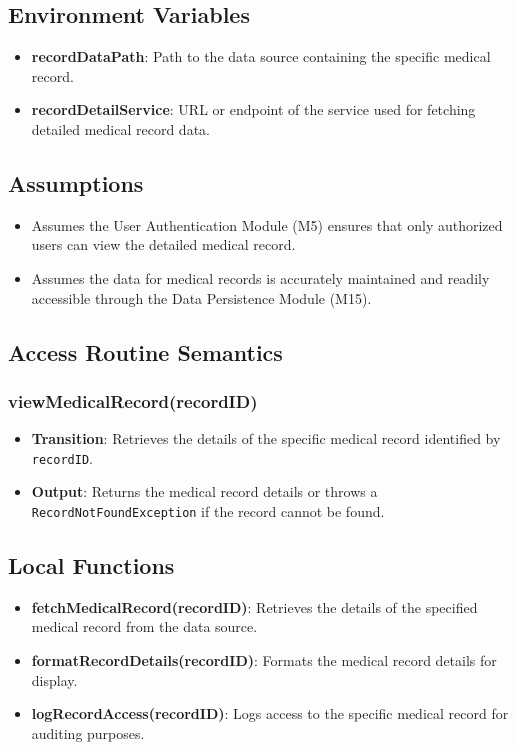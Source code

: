\documentclass[12pt, titlepage]{article}
\begin{document}
\subsection{Environment Variables}
\begin{itemize}
\item \textbf{recordDataPath}: Path to the data source containing the specific medical record.
\item \textbf{recordDetailService}: URL or endpoint of the service used for fetching detailed medical record data.
\end{itemize}

\subsection{Assumptions}
\begin{itemize}
    \item Assumes the User Authentication Module (M5) ensures that only authorized users can view the detailed medical record.
    \item Assumes the data for medical records is accurately maintained and readily accessible through the Data Persistence Module (M15).
\end{itemize}


\subsection{Access Routine Semantics}
\subsubsection{viewMedicalRecord(recordID)}
\begin{itemize}
    \item \textbf{Transition}: Retrieves the details of the specific medical record identified by \texttt{recordID}.
    \item \textbf{Output}: Returns the medical record details or throws a \texttt{RecordNotFoundException} if the record cannot be found.
\end{itemize}

\subsection{Local Functions}
\begin{itemize}
\item \textbf{fetchMedicalRecord(recordID)}: Retrieves the details of the specified medical record from the data source.
\item \textbf{formatRecordDetails(recordID)}: Formats the medical record details for display.
\item \textbf{logRecordAccess(recordID)}: Logs access to the specific medical record for auditing purposes.
\end{itemize}
\end{document}
